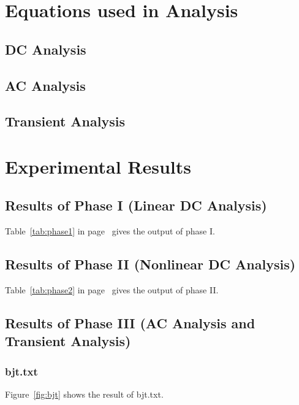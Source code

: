 \documentclass[12pt]{article}
\begin{document}
\section{Equations used in Analysis}
\subsection{DC Analysis}
\subsection{AC Analysis}
\subsection{Transient Analysis}


\section{Experimental Results}
\subsection{Results of Phase I (Linear DC Analysis)}
Table~\ref{tab:phase1} in page~\pageref{tab:phase1} gives the output of phase I.



\subsection{Results of Phase II (Nonlinear DC Analysis)}
Table~\ref{tab:phase2} in page~\pageref{tab:phase2} gives the output of phase II.


\subsection{Results of Phase III (AC Analysis and Transient Analysis)}
\subsubsection{bjt.txt}
Figure~\ref{fig:bjt} shows the result of bjt.txt.
\end{document}
